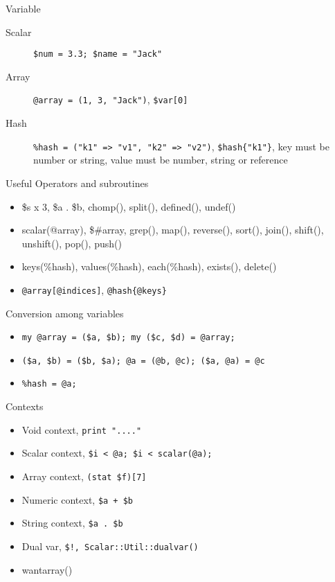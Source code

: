 \documentclass{beamer}
\begin{document}
\begin{frame}[containsverbatim]{Variable}
  \begin{description}
    \item[Scalar]   \lstinline!$num = 3.3; $name = "Jack"!
    \item[Array]    \lstinline!@array = (1, 3, "Jack")!, \lstinline!$var[0]!
    \item[Hash]     \lstinline!%hash = ("k1" => "v1", "k2" => "v2")!, \lstinline!$hash{"k1"}!,
                    key must be number or string, value must be number, string or reference
  \end{description}
\end{frame}

\begin{frame}[containsverbatim]{Useful Operators and subroutines}
  \begin{itemize}
    \item  \$s x 3, \$a . \$b, chomp(), split(), defined(), undef()
    \item  scalar(@array), \$\#array, grep(), map(), reverse(), sort(), join(),
           shift(), unshift(), pop(), push()
    \item  keys(\%hash), values(\%hash), each(\%hash), exists(), delete()
    \item  \lstinline!@array[@indices]!, \lstinline!@hash{@keys}!
  \end{itemize}
\end{frame}

\begin{frame}[containsverbatim]{Conversion among variables}
  \begin{itemize}
    \item \lstinline!my @array = ($a, $b); my ($c, $d) = @array;!
    \item \lstinline!($a, $b) = ($b, $a); @a = (@b, @c); ($a, @a) = @c!
    \item \lstinline!%hash = @a;!
  \end{itemize}
\end{frame}

\begin{frame}{Contexts}
  \begin{itemize}
    \item Void context, \texttt{print "...."}
    \item Scalar context, \texttt{\$i < @a; \$i < scalar(@a);}
    \item Array context, \texttt{(stat \$f)[7]}
    \item Numeric context, \texttt{\$a + \$b}
    \item String context, \texttt{\$a\ .\ \$b}
    \item Dual var, \texttt{\$!, Scalar::Util::dualvar()}
    \item wantarray()
  \end{itemize}
\end{frame}
\end{document}
